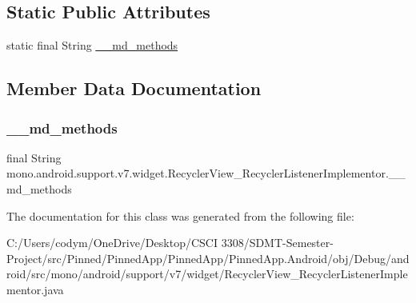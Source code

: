 \subsection*{Static Public Attributes}
\begin{DoxyCompactItemize}
\item 
static final String \hyperlink{classmono_1_1android_1_1support_1_1v7_1_1widget_1_1_recycler_view___recycler_listener_implementor_aa5a0aa7a98140d109a11d924d7dbd6aa}{\+\_\+\+\_\+md\+\_\+methods}
\end{DoxyCompactItemize}


\subsection{Member Data Documentation}
\mbox{\label{classmono_1_1android_1_1support_1_1v7_1_1widget_1_1_recycler_view___recycler_listener_implementor_aa5a0aa7a98140d109a11d924d7dbd6aa}} 
\subsubsection{\texorpdfstring{\+\_\+\+\_\+md\+\_\+methods}{\_\_md\_methods}}
{\footnotesize\ttfamily final String mono.\+android.\+support.\+v7.\+widget.\+Recycler\+View\+\_\+\+Recycler\+Listener\+Implementor.\+\_\+\+\_\+md\+\_\+methods\hspace{0.3cm}{\ttfamily [static]}}



The documentation for this class was generated from the following file\+:\begin{DoxyCompactItemize}
\item 
C\+:/\+Users/codym/\+One\+Drive/\+Desktop/\+C\+S\+C\+I 3308/\+S\+D\+M\+T-\/\+Semester-\/\+Project/src/\+Pinned/\+Pinned\+App/\+Pinned\+App/\+Pinned\+App.\+Android/obj/\+Debug/android/src/mono/android/support/v7/widget/Recycler\+View\+\_\+\+Recycler\+Listener\+Implementor.\+java\end{DoxyCompactItemize}
